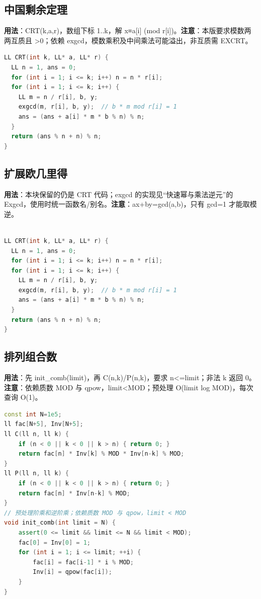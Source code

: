 \documentclass[a4paper,9pt]{extarticle}
\begin{document}
\subsection{中国剩余定理}

\textbf{用法}：CRT(\allowbreak{}k,\allowbreak{}a,\allowbreak{}r)，数组下标 1..k，解 x≡a[i] (mod r[i])。\textbf{注意}：本版要求模数两两互质且 >0；依赖 exgcd，模数乘积及中间乘法可能溢出，非互质需 EXCRT。

\begin{lstlisting}[language={C++}]
LL CRT(int k, LL* a, LL* r) {
  LL n = 1, ans = 0;
  for (int i = 1; i <= k; i++) n = n * r[i];
  for (int i = 1; i <= k; i++) {
    LL m = n / r[i], b, y;
    exgcd(m, r[i], b, y);  // b * m mod r[i] = 1
    ans = (ans + a[i] * m * b % n) % n;
  }
  return (ans % n + n) % n;
}
\end{lstlisting}

\subsection{扩展欧几里得}

\textbf{用法}：本块保留的仍是 CRT 代码；exgcd 的实现见“快速幂与乘法逆元”的 Exgcd，使用时统一函数名/别名。\textbf{注意}：ax+\allowbreak{}by=\allowbreak{}gcd(\allowbreak{}a,\allowbreak{}b)，只有 gcd=1 才能取模逆。

\begin{lstlisting}[language={C++}]

LL CRT(int k, LL* a, LL* r) {
  LL n = 1, ans = 0;
  for (int i = 1; i <= k; i++) n = n * r[i];
  for (int i = 1; i <= k; i++) {
    LL m = n / r[i], b, y;
    exgcd(m, r[i], b, y);  // b * m mod r[i] = 1
    ans = (ans + a[i] * m * b % n) % n;
  }
  return (ans % n + n) % n;
}

\end{lstlisting}
\subsection{排列组合数}

\textbf{用法}：先 init\_\allowbreak{}comb(\allowbreak{}limit)，再 C(\allowbreak{}n,\allowbreak{}k)\allowbreak{}/\allowbreak{}P(\allowbreak{}n,\allowbreak{}k)，要求 n<=limit；非法 k 返回 0。\textbf{注意}：依赖质数 MOD 与 qpow，limit<\allowbreak{}MOD；预处理 O(limit log MOD)，每次查询 O(1)。

\begin{lstlisting}[language={C++}]
const int N=1e5;
ll fac[N+5], Inv[N+5];
ll C(ll n, ll k) {
    if (n < 0 || k < 0 || k > n) { return 0; }
    return fac[n] * Inv[k] % MOD * Inv[n-k] % MOD;
}
ll P(ll n, ll k) {
    if (n < 0 || k < 0 || k > n) { return 0; }
    return fac[n] * Inv[n-k] % MOD;
}
// 预处理阶乘和逆阶乘；依赖质数 MOD 与 qpow，limit < MOD
void init_comb(int limit = N) {
    assert(0 <= limit && limit <= N && limit < MOD);
    fac[0] = Inv[0] = 1;
    for (int i = 1; i <= limit; ++i) {
        fac[i] = fac[i-1] * i % MOD;
        Inv[i] = qpow(fac[i]);
    }
}
\end{lstlisting}
\end{document}

